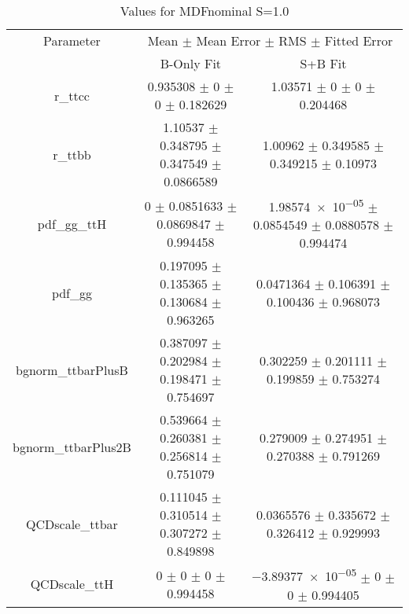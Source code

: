 \begin{table}
\centering
\caption{Values for MDFnominal S=1.0}
\begin{tabular}{ccc}
\toprule
Parameter & \multicolumn{2}{c}{Mean $\pm$ Mean Error $\pm$ RMS $\pm$ Fitted Error}\\
 & B-Only Fit & S+B Fit\\
\midrule
r\_ttcc & \num{0.935308} $\pm$ \num{0} $\pm$ \num{0} $\pm$ \num{0.182629} & \num{1.03571} $\pm$ \num{0} $\pm$ \num{0} $\pm$ \num{0.204468}\\
r\_ttbb & \num{1.10537} $\pm$ \num{0.348795} $\pm$ \num{0.347549} $\pm$ \num{0.0866589} & \num{1.00962} $\pm$ \num{0.349585} $\pm$ \num{0.349215} $\pm$ \num{0.10973}\\
pdf\_gg\_ttH & \num{0} $\pm$ \num{0.0851633} $\pm$ \num{0.0869847} $\pm$ \num{0.994458} & \num{1.98574e-05} $\pm$ \num{0.0854549} $\pm$ \num{0.0880578} $\pm$ \num{0.994474}\\
pdf\_gg & \num{0.197095} $\pm$ \num{0.135365} $\pm$ \num{0.130684} $\pm$ \num{0.963265} & \num{0.0471364} $\pm$ \num{0.106391} $\pm$ \num{0.100436} $\pm$ \num{0.968073}\\
bgnorm\_ttbarPlusB & \num{0.387097} $\pm$ \num{0.202984} $\pm$ \num{0.198471} $\pm$ \num{0.754697} & \num{0.302259} $\pm$ \num{0.201111} $\pm$ \num{0.199859} $\pm$ \num{0.753274}\\
bgnorm\_ttbarPlus2B & \num{0.539664} $\pm$ \num{0.260381} $\pm$ \num{0.256814} $\pm$ \num{0.751079} & \num{0.279009} $\pm$ \num{0.274951} $\pm$ \num{0.270388} $\pm$ \num{0.791269}\\
QCDscale\_ttbar & \num{0.111045} $\pm$ \num{0.310514} $\pm$ \num{0.307272} $\pm$ \num{0.849898} & \num{0.0365576} $\pm$ \num{0.335672} $\pm$ \num{0.326412} $\pm$ \num{0.929993}\\
QCDscale\_ttH & \num{0} $\pm$ \num{0} $\pm$ \num{0} $\pm$ \num{0.994458} & \num{-3.89377e-05} $\pm$ \num{0} $\pm$ \num{0} $\pm$ \num{0.994405}\\
\bottomrule
\end{tabular}
\end{table}